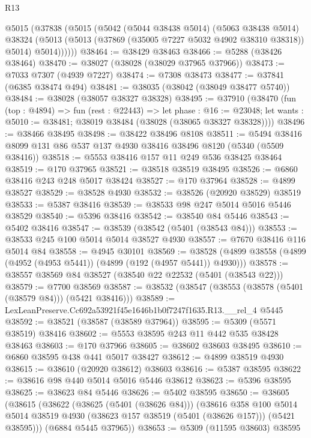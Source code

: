 \begin{lexlean}{R13}
\begin{coremodule}
      @5015
        (@37838
          (@5015
            (@5042
              (@5044 @38438 @5014)
              (@5063 @38438 @5014)
              @38324
              (@5013 (@5013 (@37869 (@35005 @7227 @5032 @4902 @38310 @38318)) @5014) @5014))))))
@38464 := @38429 @38463
@38466 := @5288 (@38426 @38464)
@38470 := @38027 (@38028 (@38029 @37965 @37966))
@38473 := @7033 @7307 (@4939 @7227)
@38474 := @7308 @38473
@38477 := @37841 (@6385 @38474 @494)
@38481 := @38035 (@38042 (@38049 @38477 @5740))
@38484 := @38028 (@38057 @38327 @38328)
@38495 := @37910
    (@38470
      (fun (top : @4894) =>
      fun (rest : @22443) =>
      let phase : @16 := @23048;
      let wants : @5010 := @38481; @38019 @38484 (@38028 (@38065 @38327 @38328))))
@38496 := @38466 @38495
@38498 := @38422 @38496 @8108
@38511 := @5494 @38416 @8099 @131 @86 @537 @137 @4930 @38416 @38496 @8120 (@5340 (@5509 @38416))
@38518 := @5553 @38416 @157 @11 @249 @536 @38425 @38464
@38519 := @170 @37965
@38521 := @38518 @38519 @38495
@38526 := @6860 @38416 @243 @248 @5017 @38424
@38527 := @170 @37964
@38528 := @4899 @38527
@38529 := @38528 @4930
@38532 := @38526 (@20920 @38529) @38519
@38533 := @5387 @38416
@38539 := @38533 @98 @247 @5014 @5016 @5446 @38529
@38540 := @5396 @38416
@38542 := @38540 @84 @5446
@38543 := @5402 @38416
@38547 := @38539 (@38542 (@5401 (@38543 @84)))
@38553 := @38533 @245 @100 @5014 @5014 @38527 @4930
@38557 := @7670 @38416 @116 @5014 @84
@38558 := @4945 @30101
@38569 := @38528 (@4899 @38558 (@4899 (@4952 (@4953 @5441)) (@4899 (@192 (@4957 @5441)) @4930)))
@38578 := @38557 @38569 @84 @38527 (@38540 @22 @22532 (@5401 (@38543 @22)))
@38579 := @7700 @38569
@38587 := @38532 (@38547 (@38553 (@38578 (@5401 (@38579 @84))) (@5421 @38416)))
@38589 := LexLeanPreserve.Cc692a53921f45e1646b1b0f7247f1635.R13.__rel_4 @5445
@38592 := @38521 (@38587 (@38589 @37964))
@38595 := @5309 (@5571 @38519) @38416
@38602 := @5553 @38595 @243 @11 @442 @535 @38428 @38463
@38603 := @170 @37966
@38605 := @38602 @38603 @38495
@38610 := @6860 @38595 @438 @441 @5017 @38427
@38612 := @4899 @38519 @4930
@38615 := @38610 (@20920 @38612) @38603
@38616 := @5387 @38595
@38622 := @38616 @98 @440 @5014 @5016 @5446 @38612
@38623 := @5396 @38595
@38625 := @38623 @84 @5446
@38626 := @5402 @38595
@38650 := @38605
    (@38615
      (@38622
        (@38625 (@5401 (@38626 @84)))
        (@38616
          @358
          @100
          @5014
          @5014
          @38519
          @4930
          (@38623 @157 @38519 (@5401 (@38626 @157)))
          (@5421 @38595)))
      (@6884 @5445 @37965))
@38653 := @5309 (@11595 @38603) @38595

\end{coremodule}
\end{lexlean}
